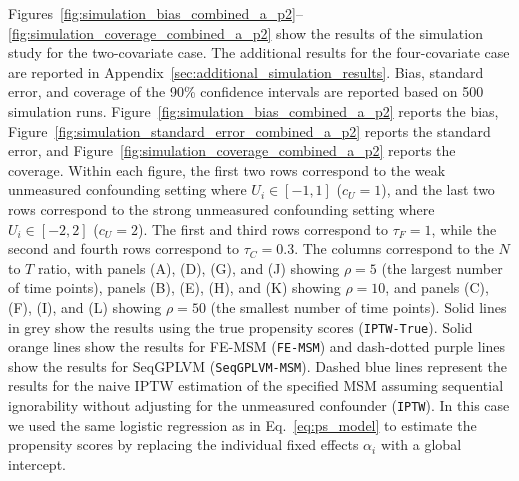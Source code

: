 Figures~\ref{fig:simulation_bias_combined_a_p2}--\ref{fig:simulation_coverage_combined_a_p2} show the results of the simulation study for the 
two-covariate case. The additional results for the four-covariate case are 
reported in Appendix~\ref{sec:additional_simulation_results}. Bias, standard error, and coverage of the 
90\% confidence intervals are reported based on 500 simulation runs. 
Figure~\ref{fig:simulation_bias_combined_a_p2} reports the bias, 
Figure~\ref{fig:simulation_standard_error_combined_a_p2} reports the standard error, and 
Figure~\ref{fig:simulation_coverage_combined_a_p2} reports the coverage. 
Within each figure, the first two rows correspond to the weak unmeasured confounding setting where 
$U_i \in [-1,1]$ ($c_U=1$), and the last two rows correspond to the strong unmeasured confounding 
setting where $U_i \in [-2,2]$ ($c_U=2$). The first and third rows correspond to 
$\tau_F = 1$, while the second and fourth rows correspond to $\tau_C = 0.3$. 
The columns correspond to the $N$ to $T$ ratio, with panels (A), (D), (G), and (J) showing 
$\rho = 5$ (the largest number of time points), panels (B), (E), (H), and (K) showing 
$\rho = 10$, and panels (C), (F), (I), and (L) showing $\rho = 50$ 
(the smallest number of time points). Solid lines in grey show the results using the 
true propensity scores (\texttt{IPTW-True}). Solid orange lines 
show the results for FE-MSM (\texttt{FE-MSM}) and dash-dotted 
purple lines show the results for SeqGPLVM (\texttt{SeqGPLVM-MSM}). 
Dashed blue lines 
represent the results for the naive IPTW estimation of the specified MSM assuming 
sequential ignorability without adjusting for the unmeasured confounder (\texttt{IPTW}). 
In this case we used the same logistic regression as 
in Eq.~\eqref{eq:ps_model} to estimate the propensity scores by replacing 
the individual 
fixed effects $\alpha_i$ with a global intercept.

